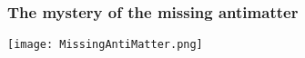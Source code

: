 % 
%
%

%

%

%
%

\begin{frame}
\frametitle{The mystery of the missing antimatter}
\texttt{[image: MissingAntiMatter.png]}
\end{frame}

